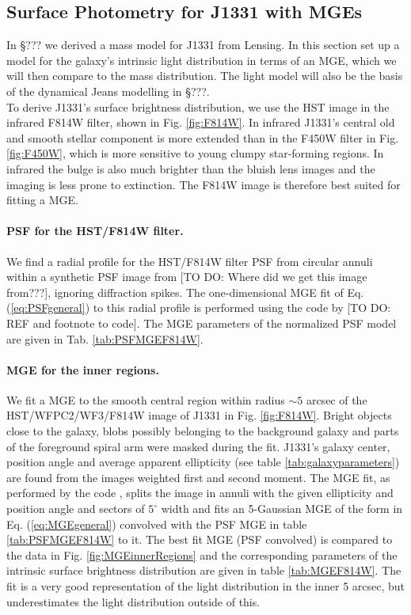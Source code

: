 \subsection{Surface Photometry for J1331 with MGEs}

In \S ??? we derived a mass model for J1331 from Lensing. In this section set up a model for the galaxy's intrinsic light distribution in terms of an MGE, which we will then compare to the mass distribution. The light model will also be the basis of the dynamical Jeans modelling in \S ???.
\\To derive J1331's surface brightness distribution, we use the HST image in the infrared F814W filter, shown in Fig. \ref{fig:F814W}. In infrared J1331's central old and smooth stellar component is more extended than in the F450W filter in Fig. \ref{fig:F450W}, which is more sensitive to young clumpy star-forming regions. In infrared the bulge is also much brighter than the bluish lens images and the imaging is less prone to extinction. The F814W image is therefore best suited for fitting a MGE. 

\paragraph{PSF for the HST/F814W filter.} We find a radial profile for the HST/F814W filter PSF from circular annuli within a synthetic PSF image from [TO DO: Where did we get this image from???], ignoring diffraction spikes. The one-dimensional MGE fit of Eq. (\ref{eq:PSFgeneral}) to this radial profile is performed using the code by [TO DO: REF and footnote to code]. The MGE parameters of the normalized PSF model are given in Tab. \ref{tab:PSFMGEF814W}.

\paragraph{MGE for the inner regions.} We fit a MGE to the smooth central region within radius $\sim 5$ arcsec of the HST/WFPC2/WF3/F814W image of J1331 in Fig. \ref{fig:F814W}. Bright objects  close to the galaxy, blobs possibly belonging to the background galaxy and parts of the foreground spiral arm were masked during the fit. J1331's galaxy center, position angle and average apparent ellipticity (see table \ref{tab:galaxyparameters}) are found from the images weighted first and second moment. The MGE fit, as performed by the code \cite{Cap02}, splits the image in annuli with the given ellipticity and position angle and sectors of $5^\circ$ width and fits an 5-Gaussian MGE of the form in Eq. (\ref{eq:MGEgeneral}) convolved with the PSF MGE in table \ref{tab:PSFMGEF814W} to it. The best fit MGE (PSF convolved) is compared to the data in Fig. \ref{fig:MGEinnerRegions} and the corresponding parameters of the intrinsic surface brightness distribution are given in table \ref{tab:MGEF814W}. The fit is a very good representation of the light distribution in the inner 5 arcsec, but underestimates the light distribution outside of this.


